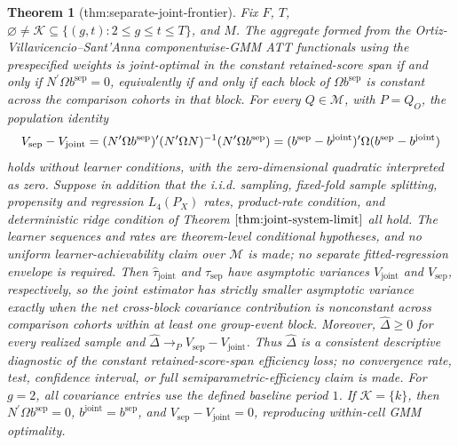 \documentclass{article}
\newtheorem{theorem}{Theorem}
\begin{document}
\begin{theorem}[thm:separate-joint-frontier]\label{thm:separate-joint-frontier}
Fix \(F\), \(T\), \(\varnothing\ne\mathcal K\subseteq\{(g,t):2\le g\le t\le T\}\), and \(M\). The aggregate formed from the Ortiz-Villavicencio--Sant'Anna componentwise-GMM ATT functionals using the prespecified weights is joint-optimal in the constant retained-score span if and only if \(N^{\prime}\Omega b^{\mathrm{sep}}=0\), equivalently if and only if each block of \(\Omega b^{\mathrm{sep}}\) is constant across the comparison cohorts in that block. For every \(Q\in\mathcal M\), with \(P=Q_O\), the population identity
\[
\makebox[\linewidth][c]{\resizebox{0.98\linewidth}{!}{\(\displaystyle V_{\mathrm{sep}}-V_{\mathrm{joint}}
=(N^{\prime}\Omega b^{\mathrm{sep}})^{\prime}(N^{\prime}\Omega N)^{-1}(N^{\prime}\Omega b^{\mathrm{sep}})
=(b^{\mathrm{sep}}-b^{\mathrm{joint}})^{\prime}\Omega(b^{\mathrm{sep}}-b^{\mathrm{joint}})\)}}
\]
holds without learner conditions, with the zero-dimensional quadratic interpreted as zero. Suppose in addition that the i.i.d. sampling, fixed-fold sample splitting, propensity and regression \(L_4(P_X)\) rates, product-rate condition, and deterministic ridge condition of Theorem \(\ref{thm:joint-system-limit}\) all hold. The learner sequences and rates are theorem-level conditional hypotheses, and no uniform learner-achievability claim over \(\mathcal M\) is made; no separate fitted-regression envelope is required. Then \(\widehat\tau_{\mathrm{joint}}\) and \(\widehat\tau_{\mathrm{sep}}\) have asymptotic variances \(V_{\mathrm{joint}}\) and \(V_{\mathrm{sep}}\), respectively, so the joint estimator has strictly smaller asymptotic variance exactly when the net cross-block covariance contribution is nonconstant across comparison cohorts within at least one group-event block. Moreover, \(\widehat\Delta\ge0\) for every realized sample and \(\widehat\Delta\to_P V_{\mathrm{sep}}-V_{\mathrm{joint}}\). Thus \(\widehat\Delta\) is a consistent descriptive diagnostic of the constant retained-score-span efficiency loss; no convergence rate, test, confidence interval, or full semiparametric-efficiency claim is made. For \(g=2\), all covariance entries use the defined baseline period \(1\). If \(\mathcal K=\{k\}\), then \(N^{\prime}\Omega b^{\mathrm{sep}}=0\), \(b^{\mathrm{joint}}=b^{\mathrm{sep}}\), and \(V_{\mathrm{sep}}-V_{\mathrm{joint}}=0\), reproducing within-cell GMM optimality.
\end{theorem}
\end{document}
